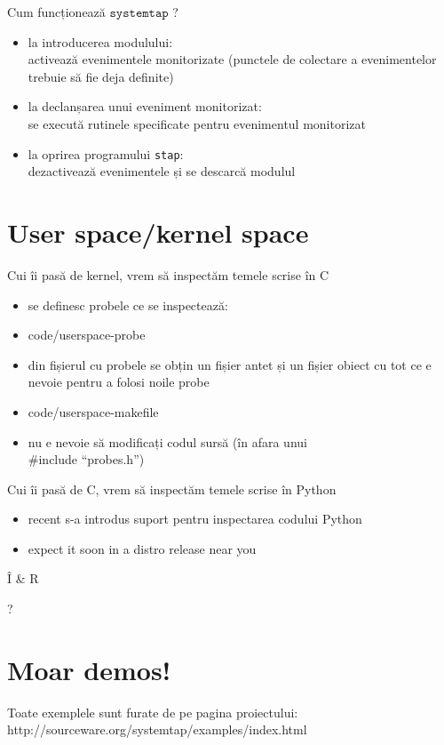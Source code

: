 \documentclass{beamer}
\newcommand{\systemtap}{$\texttt{systemtap}$ }
\begin{document}
    
\begin{frame}{Cum funcționează \systemtap?}
  \begin{itemize}
  \item la introducerea modulului: \\ \small activează evenimentele
    monitorizate (punctele de colectare a evenimentelor trebuie să fie
    deja definite)
  \item la declanșarea unui eveniment monitorizat: \\ \small se
    execută rutinele specificate pentru evenimentul monitorizat
  \item la oprirea programului \texttt{stap}: \\ \small dezactivează
    evenimentele și se descarcă modulul
  \end {itemize}
\end{frame}

\section{User space/kernel space}

\begin{frame}{Cui îi pasă de kernel, vrem să inspectăm temele scrise în C}
  \begin{itemize}
    \item se definesc probele ce se inspectează:
    \item  {code/userspace-probe}
    \item din fișierul cu probele se obțin un fișier antet și un
      fișier obiect cu tot ce e nevoie pentru a folosi noile probe
    \item  {code/userspace-makefile}
  \item nu e nevoie să modificați codul sursă (în afara unui \\ \#include ``probes.h'')
  \end{itemize}
\end{frame}

\begin{frame}{Cui îi pasă de C, vrem să inspectăm temele scrise în Python}
  \begin{itemize}
    \item recent s-a introdus suport pentru inspectarea codului Python
    \item expect it soon in a distro release near you
  \end{itemize}
\end{frame}


\begin{frame}{Î \& R}
  \begin{centering}
    \Huge ?    \par
  \end{centering}
\end{frame}

\section{Moar demos!}
\begin{frame}
Toate exemplele sunt furate de pe pagina proiectului: http://sourceware.org/systemtap/examples/index.html
\end{frame}
\end{document}
